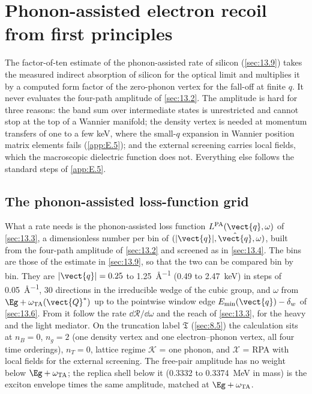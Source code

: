 \section{Phonon-assisted electron recoil from first principles}\label{app:E.14}

The factor-of-ten estimate of the phonon-assisted rate of silicon (\cref{sec:13.9}) takes the measured indirect absorption of silicon for the optical limit and multiplies it by a computed form factor of the zero-phonon vertex for the fall-off at finite $q$. It never evaluates the four-path amplitude of \cref{sec:13.2}. The amplitude is hard for three reasons: the band sum over intermediate states is unrestricted and cannot stop at the top of a Wannier manifold; the density vertex is needed at momentum transfers of one to a few keV, where the small-$q$ expansion in Wannier position matrix elements fails (\cref{app:E.5}); and the external screening carries local fields, which the macroscopic dielectric function does not. Everything else follows the standard steps of \cref{app:E.5}.

\subsection{The phonon-assisted loss-function grid}

What a rate needs is the phonon-assisted loss function $L^{\mathrm{PA}}(\vect{q},\omega)$ of \cref{sec:13.3}, a dimensionless number per bin of $(|\vect{q}|,\hat{\vect{q}},\omega)$, built from the four-path amplitude of \cref{sec:13.2} and screened as in \cref{sec:13.4}. The bins are those of the estimate in \cref{sec:13.9}, so that the two can be compared bin by bin. They are $|\vect{q}| = 0.25$ to \SI{1.25}{\angstrom^{-1}} (0.49 to \SI{2.47}{keV}) in steps of \SI{0.05}{\angstrom^{-1}}, 30 directions in the irreducible wedge of the cubic group, and $\omega$ from $\Eg + \omega_{\mathrm{TA}}(\vect{Q}^*)$ up to the pointwise window edge $E_{\mathrm{min}}(\vect{q}) - \delta_w$ of \cref{sec:13.6}. From it follow the rate $\dd\mathcal{R}/\dd\omega$ and the reach of \cref{sec:13.3}, for the heavy and the light mediator. On the truncation label $\mathfrak{T}$ (\cref{sec:8.5}) the calculation sits at $n_B = 0$, $n_g = 2$ (one density vertex and one electron--phonon vertex, all four time orderings), $n_T = 0$, lattice regime $\mathcal{K}$ = one phonon, and $\mathcal{X}$ = RPA with local fields for the external screening. The free-pair amplitude has no weight below $\Eg + \omega_{\mathrm{TA}}$; the replica shell below it (0.3332 to \SI{0.3374}{MeV} in mass) is the exciton envelope times the same amplitude, matched at $\Eg + \omega_{\mathrm{TA}}$.

